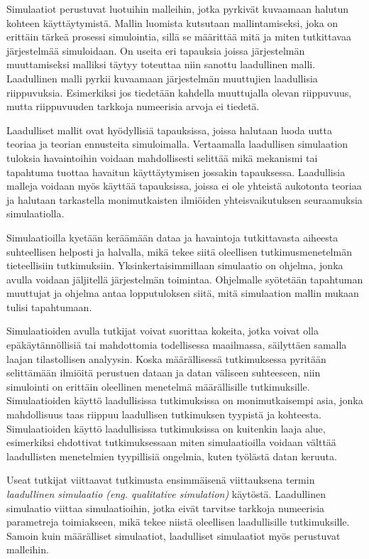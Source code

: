 \documentclass[utf8]{gradu3}
\begin{document}
Simulaatiot perustuvat luotuihin malleihin, 
jotka pyrkivät kuvaamaan halutun kohteen käyttäytymistä. 
Mallin luomista kutsutaan mallintamiseksi, joka on erittäin tärkeä prosessi simulointia,
sillä se määrittää mitä ja miten tutkittavaa järjestelmää simuloidaan. 
On useita eri tapauksia joissa järjestelmän muuttamiseksi malliksi 
täytyy toteuttaa niin sanottu laadullinen malli. 
Laadullinen malli pyrkii kuvaamaan järjestelmän muuttujien laadullisia riippuvuksia.
Esimerkiksi jos tiedetään kahdella muuttujalla olevan riippuvuus, 
mutta riippuvuuden tarkkoja numeerisia arvoja ei tiedetä.

Laadulliset mallit ovat hyödyllisiä tapauksissa, joissa halutaan luoda uutta teoriaa ja teorian ennusteita simuloimalla. Vertaamalla laadullisen simulaation tuloksia havaintoihin 
voidaan mahdollisesti selittää mikä mekanismi tai tapahtuma tuottaa havaitun käyttäytymisen jossakin tapauksessa.
Laadullisia malleja voidaan myös käyttää tapauksissa, joissa ei ole yhteistä aukotonta teoriaa ja halutaan tarkastella monimutkaisten ilmiöiden yhteisvaikutuksen seuraamuksia simulaatiolla.

Simulaatioilla kyetään keräämään dataa ja havaintoja tutkittavasta aiheesta suhteellisen helposti ja halvalla, mikä tekee siitä oleellisen tutkimusmenetelmän tieteellisiin tutkimuksiin. Yksinkertaisimmillaan simulaatio on ohjelma, jonka avulla voidaan jäljitellä järjestelmän toimintaa. Ohjelmalle syötetään tapahtuman muuttujat ja ohjelma antaa lopputuloksen siitä, mitä simulaation mallin mukaan tulisi tapahtumaan. 

Simulaatioiden avulla tutkijat voivat suorittaa kokeita, jotka voivat olla epäkäytännöllisiä tai mahdottomia todellisessa maailmassa, säilyttäen samalla laajan tilastollisen analyysin. Koska määrällisessä tutkimuksessa pyritään selittämään ilmiöitä perustuen dataan ja datan väliseen suhteeseen, niin  simulointi on erittäin oleellinen menetelmä määrällisille tutkimuksille. 
Simulaatioiden käyttö laadullisissa tutkimuksissa on monimutkaisempi asia, 
jonka mahdollisuus taas riippuu laadullisen tutkimuksen tyypistä ja kohteesta. 
Simulaatioiden käyttö laadullisissa tutkimuksissa on kuitenkin laaja alue, 
esimerkiksi \textcite{eldabi2002quantitative} ehdottivat tutkimuksessaan miten simulaatioilla voidaan välttää laadullisten menetelmien tyypillisiä ongelmia, kuten työlästä datan keruuta. 

Useat tutkijat viittaavat \textcite{kuipers1986qualitative} tutkimusta ensimmäisenä
viittauksena termin \textit{laadullinen simulaatio (eng. qualitative simulation)} 
käytöstä. Laadullinen simulaatio viittaa simulaatioihin, 
jotka eivät tarvitse tarkkoja numeerisia parametreja toimiakseen, 
mikä tekee niistä oleellisen laadullisille tutkimuksille. 
Samoin kuin määrälliset simulaatiot, laadulliset simulaatiot myös perustuvat malleihin.
\end{document}
